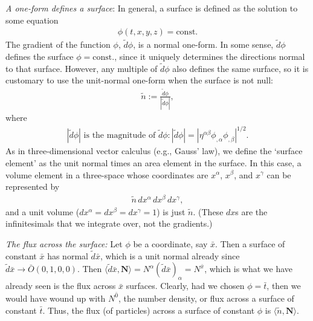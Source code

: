 \documentclass[12pt]{book}
\begin{document}
    \textit{A one-form defines a surface}: 
    In general, a surface is defined as the solution to some equation
    \begin{align}
    \phi(t, x, y, z) = \text{const.}
    \end{align}
    The gradient of the function \(\phi\), \(\tilde{d}\phi\), is a normal one-form. In some sense, \(\tilde{d}\phi\) defines the surface \(\phi = \text{const.}\), since it uniquely determines the directions normal to that surface. However, any multiple of \(\tilde{d}\phi\) also defines the same surface, so it is customary to use the unit-normal one-form when the surface is not null:
    \begin{align}
    \tilde{n} := \frac{\tilde{d}\phi}{|\tilde{d}\phi|}, \tag{4.7}
    \end{align}
    where
    \begin{align}
    |\tilde{d}\phi| \text{ is the magnitude of } \tilde{d}\phi : |\tilde{d}\phi| = \left|\eta^{\alpha\beta} \phi_{,\alpha} \phi_{,\beta}\right|^{1/2}. \tag{4.8}
    \end{align}
    As in three-dimensional vector calculus (e.g., Gauss’ law), we define the ‘surface element’ as the unit normal times an area element in the surface. In this case, a volume element in a three-space whose coordinates are \(x^\alpha\), \(x^\beta\), and \(x^\gamma\) can be represented by
    \begin{align}
    \tilde{n} \, dx^\alpha \, dx^\beta \, dx^\gamma, \tag{4.9}
    \end{align}
    and a unit volume (\(dx^\alpha = dx^\beta = dx^\gamma = 1\)) is just \(\tilde{n}\). (These \(dx\)s are the infinitesimals that we integrate over, not the gradients.)

    \textit{The flux across the surface:} 
    Let \(\phi\) be a coordinate, say \(\bar{x}\). Then a surface of constant \(\bar{x}\) has normal \(\tilde{d} \bar{x}\), which is a unit normal already since \(\tilde{d} \bar{x} \rightarrow \bar{O} (0, 1, 0, 0)\). Then \(\langle \tilde{d} \bar{x}, \mathbf{N} \rangle = N^\alpha (\tilde{d} \bar{x})_\alpha = N^{\bar{x}}\), which is what we have already seen is the flux across \(\bar{x}\) surfaces. Clearly, had we chosen \(\phi = \bar{t}\), then we would have wound up with \(N^{\bar{0}}\), the number density, or flux across a surface of constant \(\bar{t}\). Thus, the flux (of particles) across a surface of constant \(\phi\) is \(\langle \tilde{n}, \mathbf{N} \rangle\).
\end{document}
